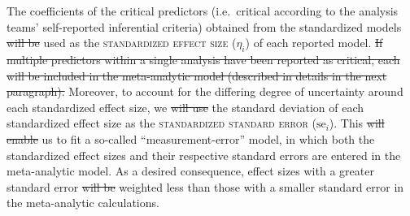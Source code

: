 \documentclass[Review,times,sageh]{sagej}
\providecommand{\DIFaddtex}[1]{{\protect\color{blue}\uwave{#1}}} %
\providecommand{\DIFdeltex}[1]{{\protect\color{red}\sout{#1}}}                      %
\providecommand{\DIFaddbegin}{} %
\providecommand{\DIFaddend}{} %
\providecommand{\DIFdelbegin}{} %
\providecommand{\DIFdelend}{} %
\providecommand{\DIFadd}[1]{\texorpdfstring{\DIFaddtex{#1}}{#1}} %
\providecommand{\DIFdel}[1]{\texorpdfstring{\DIFdeltex{#1}}{}} %
\begin{document}
The coefficients of the critical predictors (i.e.~critical according to the analysis teams' self-reported inferential criteria) obtained from the standardized models \DIFdelbegin \DIFdel{will be }\DIFdelend \DIFaddbegin \DIFadd{were }\DIFaddend used as the \textsc{standardized effect size} (\(\eta_i\)) of each reported model.
\DIFdelbegin \DIFdel{If multiple predictors within a single analysis have been reported as critical, each will be included in the meta-analytic model (described in details in the next paragraph).
}\DIFdelend Moreover, to account for the differing degree of uncertainty around each standardized effect size, we \DIFdelbegin \DIFdel{will use }\DIFdelend \DIFaddbegin \DIFadd{used }\DIFaddend the standard deviation of each standardized effect size as the \textsc{standardized standard error} (\(\text{se}_i\)).
This \DIFdelbegin \DIFdel{will enable }\DIFdelend \DIFaddbegin \DIFadd{enabled }\DIFaddend us to fit a so-called ``measurement-error'' model, in which both the standardized effect sizes and their respective standard errors are entered in the meta-analytic model.
As a desired consequence, effect sizes with a greater standard error \DIFdelbegin \DIFdel{will be }\DIFdelend \DIFaddbegin \DIFadd{are }\DIFaddend weighted less than those with a smaller standard error in the meta-analytic calculations.
\end{document}
